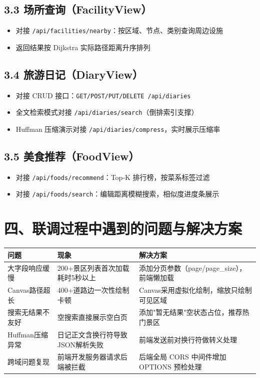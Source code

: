 \documentclass[12pt,a4paper]{article}
\begin{document}
\subsection*{3.3 场所查询（FacilityView）}

\begin{itemize}[leftmargin=2em]
    \item 对接 \texttt{/api/facilities/nearby}：按区域、节点、类别查询周边设施
    \item 返回结果按 Dijkstra 实际路径距离升序排列
\end{itemize}

\subsection*{3.4 旅游日记（DiaryView）}

\begin{itemize}[leftmargin=2em]
    \item 对接 CRUD 接口：\texttt{GET/POST/PUT/DELETE /api/diaries}
    \item 全文检索模式对接 \texttt{/api/diaries/search}（倒排索引支撑）
    \item Huffman 压缩演示对接 \texttt{/api/diaries/compress}，实时展示压缩率
\end{itemize}

\subsection*{3.5 美食推荐（FoodView）}

\begin{itemize}[leftmargin=2em]
    \item 对接 \texttt{/api/foods/recommend}：Top-K 排行榜，按菜系标签过滤
    \item 对接 \texttt{/api/foods/search}：编辑距离模糊搜索，相似度进度条展示
\end{itemize}

\section*{四、联调过程中遇到的问题与解决方案}

\begin{center}
\begin{tabular}{p{4cm} p{4cm} p{4cm}}
    \toprule
    \bfseries 问题 & \bfseries 现象 & \bfseries 解决方案 \\
    \midrule
    大字段响应缓慢 & 200+景区列表首次加载耗时5秒以上 & 添加分页参数（page/page\_size），前端懒加载 \\
    Canvas路径超长 & 400+道路边一次性绘制卡顿 & Canvas采用虚拟化绘制，缩放只绘制可见区域 \\
    搜索无结果不友好 & 空搜索直接展示空白页 & 添加"暂无结果"空状态占位，推荐热门景区 \\
    Huffman压缩异常 & 日记正文含换行符导致JSON解析失败 & 前端发送前对换行符做转义处理 \\
    跨域问题复现 & 前端开发服务器请求后端被拦截 & 后端全局 CORS 中间件增加 OPTIONS 预检处理 \\
    \bottomrule
\end{tabular}
\end{center}
\end{document}
